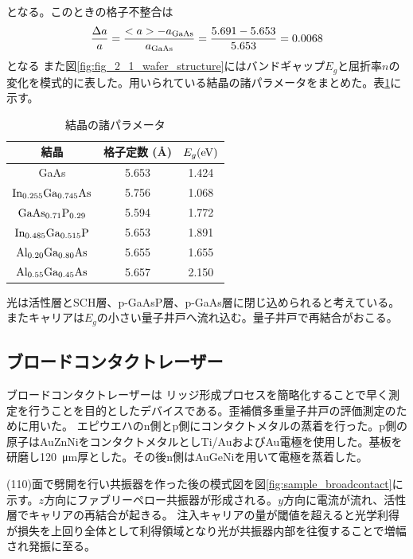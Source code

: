 となる。このときの格子不整合は
\begin{eqnarray}
\dfrac{\Delta a}{a}=\dfrac{<a> - a_{\rm{GaAs}}}{a_{\rm{GaAs}}}=\dfrac{5.691-5.653}{5.653}=0.0068
\end{eqnarray}
となる
また図\ref{fig:fig_2_1_wafer_structure}にはバンドギャップ$E_{g}$と屈折率$n$の変化を模式的に表した。用いられている結晶の諸パラメータをまとめた。表\ref{table:table_2_1_parameter}に示す。
\begin{table}[h]
  \caption{結晶の諸パラメータ}
    \label{table:table_2_1_parameter}
  \centering
  \begin{tabular}{ccc}
    \hline
      結晶&格子定数 (\AA) & $E_{g} (\rm{eV})$  \\
    \hline \hline
    GaAs  & 5.653&  1.424  \\
    $\rm{In_{0.255}Ga_{0.745}As}$&  5.756& 1.068  \\
    $\rm{GaAs_{0.71}P_{0.29}}$  &  5.594&1.772 \\
    $\rm{In_{0.485}Ga_{0.515}P}$& 5.653& 1.891\\
    $\rm{Al_{0.20}Ga_{0.80}As}$&5.655& 1.655\\
    $\rm{Al_{0.55}Ga_{0.45}As}$&5.657& 2.150\\
       \hline
  \end{tabular}
\end{table}

光は活性層とSCH層、p-GaAsP層、p-GaAs層に閉じ込められると考えている。またキャリアは$E_{g}$の小さい量子井戸へ流れ込む。量子井戸で再結合がおこる。


\subsection{ブロードコンタクトレーザー}%
ブロードコンタクトレーザーは
リッジ形成プロセスを簡略化することで早く測定を行うことを目的としたデバイスである。歪補償多重量子井戸の評価測定のために用いた。
エピウエハのn側とp側にコンタクトメタルの蒸着を行った。p側の原子はAuZnNiをコンタクトメタルとしTi/AuおよびAu電極を使用した。基板を研磨し120\ \si{\micro\metre}厚とした。その後n側はAuGeNiを用いて電極を蒸着した。


(110)面で劈開を行い共振器を作った後の模式図を図\ref{fig:sample_broadcontact}に示す。$z$方向にファブリーペロー共振器が形成される。$y$方向に電流が流れ、活性層でキャリアの再結合が起きる。
注入キャリアの量が閾値を超えると光学利得が損失を上回り全体として利得領域となり光が共振器内部を往復することで増幅され発振に至る。

